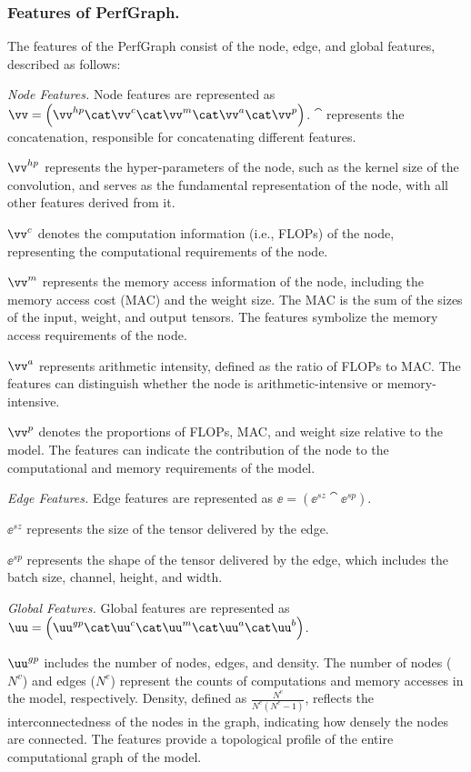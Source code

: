 \subsubsection{Features of PerfGraph.} \label{sec:features of graph}
The features of the PerfGraph consist of the node, edge, and global features, described as follows:


\emph{{Node Features.}}
Node features are represented as $\vv = \left(\vv^{hp} \cat \vv^{c} \cat \vv^{m} \cat \vv^{a} \cat \vv^{p} \right)$. $\cat$ represents the concatenation, responsible for concatenating different features.

$\vv^{hp}$ represents the hyper-parameters of the node, such as the kernel size of the convolution, and serves as the fundamental representation of the node, with all other features derived from it.

$\vv^{c}$ denotes the computation information (i.e., FLOPs) of the node, representing the computational requirements of the node.

$\vv^m$ represents the memory access information of the node, including the memory access cost (MAC) and the weight size.
The MAC is the sum of the sizes of the input, weight, and output tensors.
The features symbolize the memory access requirements of the node.

$\vv^{a}$ represents arithmetic intensity, defined as the ratio of FLOPs to MAC. The features can distinguish whether the node is arithmetic-intensive or memory-intensive.

$\vv^{p}$ denotes the proportions of FLOPs, MAC, and weight size relative to the model. The features can indicate the contribution of the node to the computational and memory requirements of the model.

\emph{{Edge Features.}}
Edge features are represented as $\ee = \left( \ee^{sz} \cat \ee^{sp} \right)$. 

$\ee^{sz}$ represents the size of the tensor delivered by the edge. 

$\ee^{sp}$ represents the shape of the tensor delivered by the edge, which includes the batch size, channel, height, and width. 

\emph{{Global Features.}}
Global features are represented as $\uu = \left( \uu^{gp} \cat \uu^{c} \cat \uu^{m} \cat \uu^{a} \cat \uu^{b} \right)$.

     $\uu^{gp}$ includes the number of nodes, edges, and density. The number of nodes ($N^v$) and edges ($N^e$) represent the counts of computations and memory accesses in the model, respectively. Density, defined as \(\frac{N^e}{N^e(N^e-1)}\), reflects the interconnectedness of the nodes in the graph, indicating how densely the nodes are connected. The features provide a topological profile of the entire computational graph of the model.

